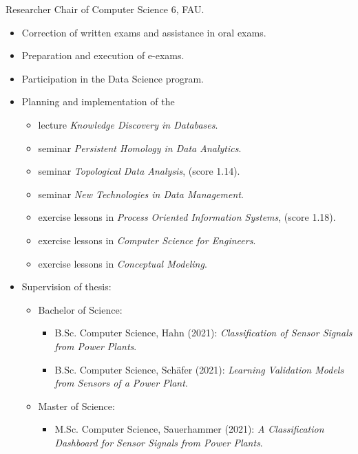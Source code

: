 \documentclass[a4paper, 11pt]{article}
\newcommand{\years}[1]{\marginnote{\scriptsize #1}}
\begin{document}
	\years{2018--21} Researcher Chair of Computer Science 6, FAU.
	\begin{itemize}
		\item Correction of written exams and assistance in oral exams.

		\item Preparation and execution of e-exams.

		\item Participation in the Data Science program.

		\item Planning and implementation of the
			\begin{itemize}
				\item lecture \emph{Knowledge Discovery in Databases}.

				\item seminar \emph{Persistent Homology in Data Analytics}.

				\item seminar \emph{Topological Data Analysis}, (score 1.14).

				\item seminar \emph{New Technologies in Data Management}.

				\item exercise lessons in \emph{Process Oriented Information Systems}, (score 1.18).

				\item exercise lessons in \emph{Computer Science for Engineers}.

				\item exercise lessons in \emph{Conceptual Modeling}.
			\end{itemize}

		\item Supervision of thesis:
			\begin{itemize}[noitemsep, leftmargin=*]
				\item Bachelor of Science:
					\begin{itemize}
						\item B.Sc. Computer Science, Hahn (2021): \emph{Classification of Sensor
							Signals from Power Plants}.

						\item B.Sc. Computer Science, Schäfer (2021): \emph{Learning Validation
							Models from Sensors of a Power Plant}.
					\end{itemize}

				\item Master of Science:
					\begin{itemize}
						\item M.Sc. Computer Science, Sauerhammer (2021): \emph{A Classification
							Dashboard for Sensor Signals from Power Plants}.


\end{itemize}
\end{itemize}
\end{itemize}
\end{document}
